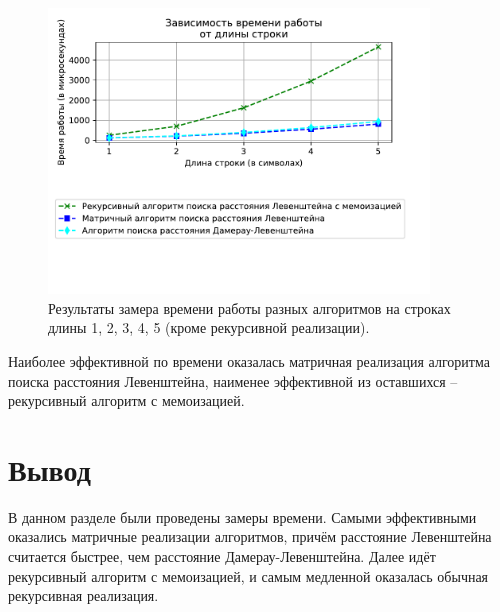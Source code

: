 \begin{figure}[h!]
	\centering
	\includegraphics[width=0.9\textwidth]{tex_parts/research2.pdf}
	\caption{\label{fig:res2} Результаты замера времени работы разных алгоритмов на строках длины 1, 2, 3, 4, 5 (кроме рекурсивной реализации).}
\end{figure}

Наиболее эффективной по времени оказалась матричная реализация алгоритма поиска расстояния Левенштейна, наименее эффективной из оставшихся -- рекурсивный алгоритм с мемоизацией.

\section{Вывод}

В данном разделе были проведены замеры времени. Самыми эффективными оказались матричные реализации алгоритмов, причём расстояние Левенштейна считается быстрее, чем расстояние Дамерау-Левенштейна. Далее идёт рекурсивный алгоритм с мемоизацией, и самым медленной оказалась обычная рекурсивная реализация.

